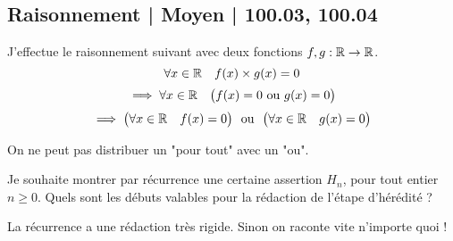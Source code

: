 \subsection{Raisonnement | Moyen | 100.03, 100.04}



\begin{question}
J'effectue le raisonnement suivant avec deux fonctions $f,g : \mathbb{R} \to \mathbb{R}$.
$$\forall x \in \mathbb{R} \quad f(x)\times g(x) = 0$$ 
$$\implies \forall x \in \mathbb{R} \quad \big(f(x) = 0 \text{ ou } g(x) = 0\big)$$
$$\implies \big(\forall x \in \mathbb{R} \quad f(x) = 0\big) \ \text{ ou } \ \big(\forall x \in \mathbb{R} \quad g(x) = 0\big)$$
\begin{answers}



\end{answers}
\begin{explanations}
On ne peut pas distribuer un "pour tout" avec un "ou". 
\end{explanations}
\end{question}


\begin{question}
Je souhaite montrer par récurrence une certaine assertion $H_n$, pour tout entier $n\ge0$.
Quels sont les débuts valables pour la rédaction de l'étape d'hérédité ?
\begin{answers}

    
    
\end{answers}
\begin{explanations}
La récurrence a une rédaction très rigide. Sinon on raconte vite n'importe quoi !
\end{explanations}
\end{question}


